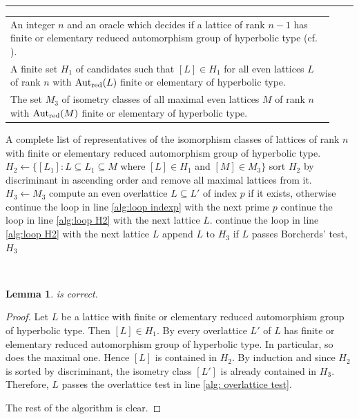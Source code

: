 \documentclass[11pt,letterpaper]{amsart}
\DeclareMathOperator{\Aut}{Aut}
\DeclareMathOperator{\disc}{disc}
\newcommand{\AutredL}{\Aut_{\rm red}(L)}
\newcommand{\AutredM}{\Aut_{\rm red}(M)}
\newtheorem{lemma}[theorem]{Lemma}
\theoremstyle{definition}
\theoremstyle{remark}
\begin{document}
\begingroup
{}\label{alg:classification}
\endgroup
\hrule
\begin{algorithmic}[1]
\REQUIRE \begin{tabular}[t]{@{\textbullet\hspace{0.5em}} p{0.928\linewidth} @{}}
    An integer $n$ and an oracle which decides if a lattice of rank $n-1$ has finite or elementary reduced automorphism group of hyperbolic type (cf. \Cref{rmk:oracle}). \\
    A finite set $H_1$ of candidates such that $[L] \in H_1$ for all even lattices $L$ of rank $n$ with $\AutredL$ finite or elementary of hyperbolic type. \\
    The set $M_3$ of isometry classes of all maximal even lattices $M$ of rank $n$ with $\AutredM$ finite or elementary of hyperbolic type.
\end{tabular}
\ENSURE A complete list of representatives of the isomorphism classes of lattices of rank $n$ with finite or elementary reduced automorphism group of hyperbolic type.
\STATE $H_2 \gets \{[L_1] : L \subseteq L_1 \subseteq M$ where $[L] \in H_1$ and $[M] \in M_3\}$ \label{alg:def H2}
\STATE sort $H_2$ by discriminant in ascending order and remove all maximal lattices from it. \label{alg:sort H2}
\STATE $H_3 \gets M_3$ \label{alg:def H3}
 \label{alg:loop H2}
\FOR{$p \mid \disc(L)$ with $p^2 \mid \disc(L)$} \label{alg:loop indexp}
\STATE compute an even overlattice $L \subseteq L'$ of index $p$ if it exists, otherwise continue 
the loop in line \ref{alg:loop indexp} with the next prime $p$ 
\label{alg: overlattice test}
\STATE continue the loop in line \ref{alg:loop H2} with the next lattice $L$. 
\ENDIF 
\ENDFOR
{}
\STATE continue the loop in line \ref{alg:loop H2} with the next lattice $L$ 
\ENDIF
\STATE append $L$ to $H_3$ if $L$ passes Borcherds' test, 
\ENDFOR
\RETURN $H_3$
\end{algorithmic}\hrulefill\\
\begin{lemma}
 is correct.
\end{lemma}
\begin{proof}
Let $L$ be a lattice with finite or elementary reduced automorphism group of hyperbolic type. Then $[L] \in H_1$. 
By  every overlattice $L'$ of $L$ has finite or elementary reduced automorphism group of hyperbolic type. In particular, so does the maximal one. Hence $[L]$ is contained in $H_2$.
By induction and since $H_2$ is sorted by discriminant, the isometry class $[L']$ is already contained in $H_3$. Therefore, $L$ passes the overlattice test in line \ref{alg: overlattice test}.

The rest of the algorithm is clear. 
\end{proof}
\end{document}
